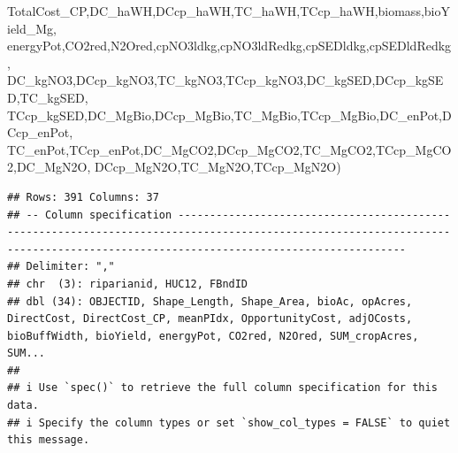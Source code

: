 \documentclass[
]{article}
\newenvironment{Shaded}{\begin{snugshade}}{\end{snugshade}}
\newcommand{\NormalTok}[1]{#1}
\begin{document}
\begin{Shaded}
\begin{Highlighting}[]
\NormalTok{         TotalCost\_CP,DC\_haWH,DCcp\_haWH,TC\_haWH,TCcp\_haWH,biomass,bioYield\_Mg,}
\NormalTok{         energyPot,CO2red,N2Ored,cpNO3ldkg,cpNO3ldRedkg,cpSEDldkg,cpSEDldRedkg,}
\NormalTok{         DC\_kgNO3,DCcp\_kgNO3,TC\_kgNO3,TCcp\_kgNO3,DC\_kgSED,DCcp\_kgSED,TC\_kgSED,}
\NormalTok{         TCcp\_kgSED,DC\_MgBio,DCcp\_MgBio,TC\_MgBio,TCcp\_MgBio,DC\_enPot,DCcp\_enPot,}
\NormalTok{         TC\_enPot,TCcp\_enPot,DC\_MgCO2,DCcp\_MgCO2,TC\_MgCO2,TCcp\_MgCO2,DC\_MgN2O,}
\NormalTok{         DCcp\_MgN2O,TC\_MgN2O,TCcp\_MgN2O)}
\end{Highlighting}
\end{Shaded}

\begin{verbatim}
## Rows: 391 Columns: 37
## -- Column specification --------------------------------------------------------------------------------------------------------------------------------------------------------------------------------
## Delimiter: ","
## chr  (3): riparianid, HUC12, FBndID
## dbl (34): OBJECTID, Shape_Length, Shape_Area, bioAc, opAcres, DirectCost, DirectCost_CP, meanPIdx, OpportunityCost, adjOCosts, bioBuffWidth, bioYield, energyPot, CO2red, N2Ored, SUM_cropAcres, SUM...
## 
## i Use `spec()` to retrieve the full column specification for this data.
## i Specify the column types or set `show_col_types = FALSE` to quiet this message.
\end{verbatim}
\end{document}
